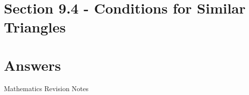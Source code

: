 \documentclass[12pt, a4paper]{article}
\begin{document}
\section*{Section 9.4 - Conditions for Similar Triangles}\label{section:1-9-4}

\section*{Answers}
\begin{enumx}[label=\arabic*.,start=1]
\item {}
\end{enumx}
\newpage
\newpage
\thispagestyle{empty}
\begin{center}
Mathematics Revision Notes\\\vspace{1cm}
\\\vspace{1cm}
{\fontsize{24pt}{24pt}\selectfont {Introduction to Coordinates}} \\\vspace{1cm}
\label{chapter:S1-10}

\end{center}
\vspace{0.5cm}
\hline
\end{document}

